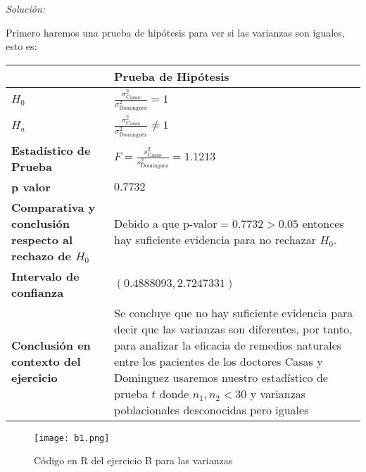 \documentclass[12pt]{article}
\newenvironment{sol}
    {\emph{Solución:}
    }
    {
    }
\begin{document}
\begin{sol}
Primero haremos una prueba de hipótesis para ver si las varianzas son iguales, esto es:

\begin{table}[h!]
\centering
\begin{tabular}{|>{\raggedright\arraybackslash}m{6cm}|>{\raggedright\arraybackslash}m{6cm}|}
\hline
 & \textbf{Prueba de Hipótesis} \\ \hline
$H_0$ & \vspace{0.5cm}$\frac{\sigma_{\text{Casas}}^2}{\sigma_{\text{Dominguez}
}^2}=1$ \vspace{0.5cm}\\ \hline
$H_a$ & \vspace{0.5cm} $\frac{\sigma_{\text{Casas}}^2}{\sigma_{\text{Dominguez}
}^2}\neq1$ \vspace{0.5cm}\\ \hline
\textbf{Estadístico de Prueba} & \vspace{0.5cm}$F = \frac{s_\text{Casas}^2}{s_\text{Dominguez}^2}=1.1213$\vspace{0.5cm} \\ \hline
\textbf{p valor} & $0.7732$ \\ \hline
\textbf{Comparativa y conclusión respecto al rechazo de $H_0$} & Debido a que p-valor$=0.7732>0.05$ entonces hay suficiente evidencia para no rechazar $H_0$. \\ \hline
\textbf{Intervalo de confianza} & $(0.4888093,2.7247331)$ \\ \hline
\textbf{Conclusión en contexto del ejercicio} & Se concluye que no hay suficiente evidencia para decir que las varianzas son diferentes, por tanto, para analizar la eficacia de remedios naturales entre los pacientes de los doctores Casas y Dominguez usaremos nuestro estadístico de prueba $t$ donde $n_1 ,n_2 < 30$ y varianzas poblacionales desconocidas pero iguales \\ \hline
\end{tabular}
\label{tab:hipotesis}
\end{table}
\pagebreak

\begin{figure}[h]  %
    \centering      %
    \texttt{[image: b1.png]} 
    \caption{Código en R del ejercicio B para las varianzas}
\end{figure}


\end{sol}
\end{document}
